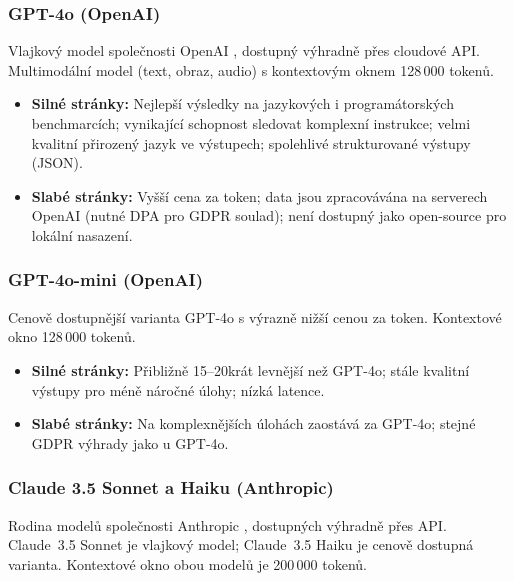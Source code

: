 \subsubsection*{GPT-4o (OpenAI)}

Vlajkový model společnosti OpenAI \cite{openai_gpt4o}, dostupný výhradně přes cloudové API.
Multimodální model (text, obraz, audio) s kontextovým oknem 128\,000 tokenů.

\begin{itemize}
    \item \textbf{Silné stránky:} Nejlepší výsledky na jazykových i programátorských benchmarcích; vynikající schopnost sledovat komplexní instrukce; velmi kvalitní přirozený jazyk ve výstupech; spolehlivé strukturované výstupy (JSON).
    \item \textbf{Slabé stránky:} Vyšší cena za token; data jsou zpracovávána na serverech OpenAI (nutné DPA pro GDPR soulad); není dostupný jako open-source pro lokální nasazení.
\end{itemize}

\subsubsection*{GPT-4o-mini (OpenAI)}

Cenově dostupnější varianta GPT-4o \cite{openai_api} s výrazně nižší cenou za token.
Kontextové okno 128\,000 tokenů.

\begin{itemize}
    \item \textbf{Silné stránky:} Přibližně 15--20krát levnější než GPT-4o; stále kvalitní výstupy pro méně náročné úlohy; nízká latence.
    \item \textbf{Slabé stránky:} Na komplexnějších úlohách zaostává za GPT-4o; stejné GDPR výhrady jako u GPT-4o.
\end{itemize}

\subsubsection*{Claude 3.5 Sonnet a Haiku (Anthropic)}

Rodina modelů společnosti Anthropic \cite{anthropic_api}, dostupných výhradně přes API.
Claude~3.5 Sonnet je vlajkový model; Claude~3.5 Haiku je cenově dostupná varianta.
Kontextové okno obou modelů je 200\,000 tokenů.

